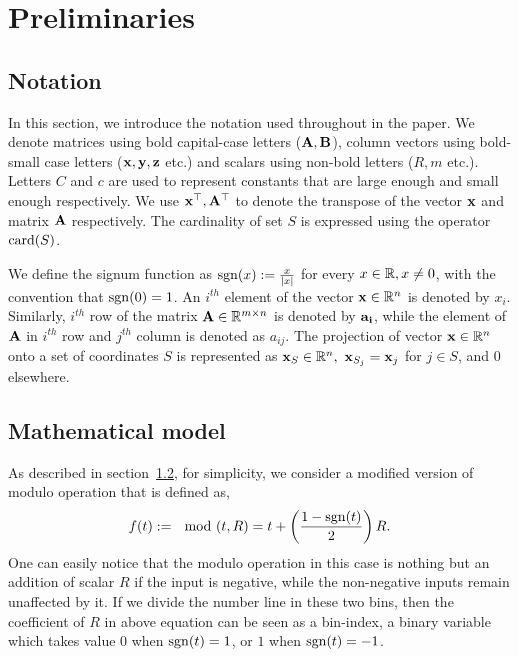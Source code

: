 \section{Preliminaries}
\label{sec:prelim}
\subsection{Notation}
\label{subsec:nota}
In this section, we introduce the notation used throughout in the paper. We denote matrices using bold capital-case letters ($\mathbf{A,B}$), column vectors using bold-small case letters ($\mathbf{x,y,z}$ etc.) and scalars using non-bold letters ($R,m$ etc.). Letters $C$ and $c$ are used to represent constants that are large enough and small enough respectively. We use $\mathbf{x}^\top,\mathbf{A}^\top$ to denote the transpose of the vector $\mathbf{x}$ and matrix $\mathbf{A}$ respectively. The cardinality of set $S$ is expressed using the operator $\mathrm{card}(S)$.

We define the signum function as $\mathrm{sgn}(x) := \frac{x}{|x|}$ for every $x \in {\mathbb{R}}, x \neq 0$, with the convention that $\mathrm{sgn}(0)=1$.
An $i^{th}$ element of the vector $\mathbf{x} \in {\mathbb{R}}^n$ is denoted by $x_{i}$. Similarly, $i^{th}$ row of the matrix $\mathbf{A} \in {\mathbb{R}}^{m \times n}$ is denoted by $\mathbf{a_i}$, while the element of $\mathbf{A}$ in $i^{th}$ row and $j^{th}$ column is denoted as $a_{ij}$. The projection of vector $\mathbf{x} \in {\mathbb{R}}^n$ onto a set of coordinates $S$ is represented as $\mathbf{x}_S \in {\mathbb{R}}^n,~\mathbf{x}_{S_j} = \mathbf{x}_j$ for $j \in S$, and $0$ elsewhere. 


\subsection{Mathematical model}
\label{subsec:model}
As described in section~\ref{subsec:model}, for simplicity, we consider a modified version of modulo operation that is defined as, 
$$
f(t) :=\mod(t,R) = t+\left( \frac{1-\mathrm{sgn}(t)}{2}\right)R.
$$
One can easily notice that the modulo operation in this case is nothing but an addition of scalar $R$ if the input is negative, while the non-negative inputs remain unaffected by it. If we divide the number line in these two bins, then the coefficient of $R$ in above equation can be seen as a bin-index, a binary variable which takes value $0$ when $\mathrm{sgn}(t)=1$, or $1$ when $\mathrm{sgn}(t)=-1$.


